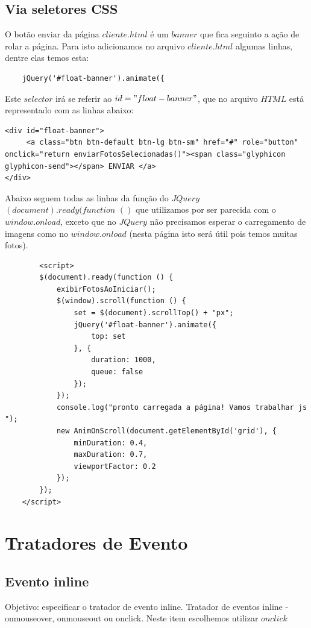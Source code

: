 \subsection{Via seletores CSS}
	O botão enviar da página $cliente.html$ é um $banner$ que fica seguinto a ação de rolar a página. Para isto adicionamos no arquivo $cliente.html$ algumas linhas, dentre elas temos esta:
		\begin{lstlisting}	
	jQuery('#float-banner').animate({
		\end{lstlisting}
		Este $selector$ irá se referir ao $id="float-banner"$, que no arquivo $HTML$ está representado com as linhas abaixo:
\begin{lstlisting}
<div id="float-banner">
     <a class="btn btn-default btn-lg btn-sm" href="#" role="button" onclick="return enviarFotosSelecionadas()"><span class="glyphicon glyphicon-send"></span> ENVIAR </a>
</div>
\end{lstlisting}

	Abaixo seguem todas as linhas da função do $JQuery$ $(document).ready(function$ $()$ que utilizamos por ser parecida com o $window.onload$, exceto que no $JQuery$ não precisamos esperar o carregamento de imagens como no $window.onload$ (nesta página isto será útil pois temos muitas fotos).
	
		\begin{lstlisting}
	    <script>
        $(document).ready(function () {
            exibirFotosAoIniciar();
            $(window).scroll(function () {
                set = $(document).scrollTop() + "px";
                jQuery('#float-banner').animate({
                    top: set
                }, {
                    duration: 1000,
                    queue: false
                });
            });
            console.log("pronto carregada a página! Vamos trabalhar js ");
            new AnimOnScroll(document.getElementById('grid'), {
                minDuration: 0.4,
                maxDuration: 0.7,
                viewportFactor: 0.2
            });
        });
    </script>
	\end{lstlisting} 
  
  
\section{Tratadores de Evento}
\subsection{Evento inline}
Objetivo: especificar o tratador de evento inline. Tratador de eventos inline - onmouseover, onmouseout ou onclick. Neste item escolhemos utilizar $onclick$

